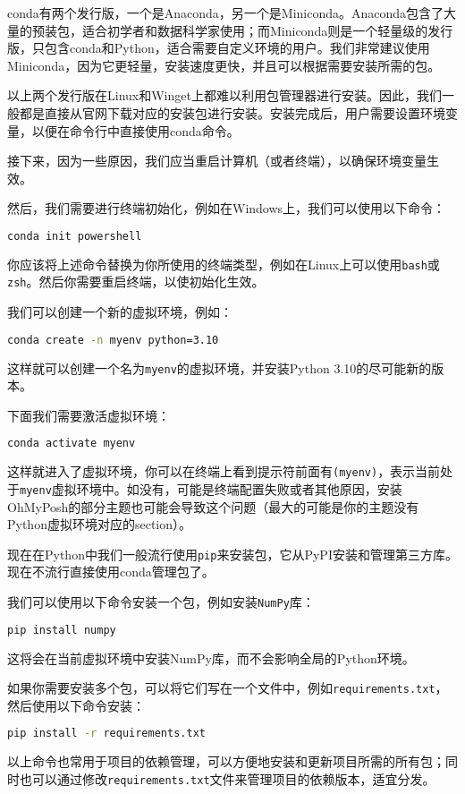 \documentclass[../main.tex]{subfiles}
\begin{document}
conda有两个发行版，一个是Anaconda，另一个是Miniconda。Anaconda包含了大量的预装包，适合初学者和数据科学家使用；而Miniconda则是一个轻量级的发行版，只包含conda和Python，适合需要自定义环境的用户。我们非常建议使用Miniconda，因为它更轻量，安装速度更快，并且可以根据需要安装所需的包。

以上两个发行版在Linux和Winget上都难以利用包管理器进行安装。因此，我们一般都是直接从官网下载对应的安装包进行安装。安装完成后，用户需要设置环境变量，以便在命令行中直接使用conda命令。

接下来，因为一些原因，我们应当重启计算机（或者终端），以确保环境变量生效。

然后，我们需要进行终端初始化，例如在Windows上，我们可以使用以下命令：
\begin{lstlisting}[language=bash]
    conda init powershell
\end{lstlisting}

你应该将上述命令替换为你所使用的终端类型，例如在Linux上可以使用\texttt{bash}或\texttt{zsh}。然后你需要重启终端，以使初始化生效。

我们可以创建一个新的虚拟环境，例如：
\begin{lstlisting}[language=bash]
    conda create -n myenv python=3.10
\end{lstlisting}
这样就可以创建一个名为\texttt{myenv}的虚拟环境，并安装Python 3.10的尽可能新的版本。

下面我们需要激活虚拟环境：
\begin{lstlisting}[language=bash]
    conda activate myenv
\end{lstlisting}
这样就进入了虚拟环境，你可以在终端上看到提示符前面有\texttt{(myenv)}，表示当前处于\texttt{myenv}虚拟环境中。如没有，可能是终端配置失败或者其他原因，安装OhMyPosh的部分主题也可能会导致这个问题（最大的可能是你的主题没有Python虚拟环境对应的section）。

现在在Python中我们一般流行使用\texttt{pip}来安装包，它从PyPI安装和管理第三方库。现在不流行直接使用conda管理包了。

我们可以使用以下命令安装一个包，例如安装\texttt{NumPy}库：
\begin{lstlisting}[language=bash]
    pip install numpy
\end{lstlisting}
这将会在当前虚拟环境中安装NumPy库，而不会影响全局的Python环境。

如果你需要安装多个包，可以将它们写在一个文件中，例如\texttt{requirements.txt}，然后使用以下命令安装：
\begin{lstlisting}[language=bash]
    pip install -r requirements.txt
\end{lstlisting}
以上命令也常用于项目的依赖管理，可以方便地安装和更新项目所需的所有包；同时也可以通过修改\texttt{requirements.txt}文件来管理项目的依赖版本，适宜分发。
\end{document}
